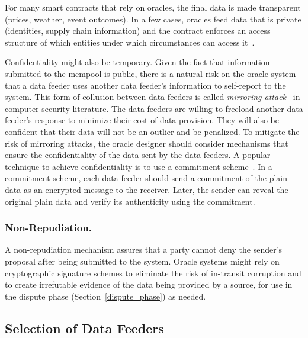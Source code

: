 
For many smart contracts that rely on oracles, the final data is made transparent (\eg prices, weather, event outcomes). In a few cases, oracles feed data that is private (\eg identities, supply chain information) and the contract enforces an access structure of which entities under which circumstances can access it~\cite{maram2021candid}.

Confidentiality might also be temporary.  Given the fact that information submitted to the mempool is public, there is a natural risk on the oracle system that a data feeder uses another data feeder's information to self-report to the system. This form of collusion between data feeders is called \textit{mirroring attack~\cite{ellis2017chainlink}} in computer security literature. The data feeders are willing to freeload another data feeder's response to minimize their cost of data provision. They will also be confident that their data will not be an outlier and be penalized. To mitigate the risk of mirroring attacks, the oracle designer should consider mechanisms that ensure the confidentiality of the data sent by the data feeders. A popular technique to achieve confidentiality is to use a commitment scheme~\cite{brassard1988minimum}. In a commitment scheme, each data feeder should send a commitment of the plain data as an encrypted message to the receiver. Later, the sender can reveal the original plain data and verify its authenticity using the commitment.

\subsubsection{Non-Repudiation.} 
A non-repudiation mechanism assures that a party cannot deny the sender's proposal after being submitted to the system. Oracle systems might rely on cryptographic signature schemes to eliminate the risk of in-transit corruption and to create irrefutable evidence of the data being provided by a source, for use in the dispute phase (Section~\ref{dispute_phase}) as needed.




\subsection{Selection of Data Feeders}\label{data_feeder_selection} 

